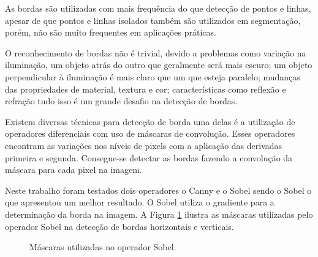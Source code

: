 As bordas são utilizadas com mais frequência do que detecção de pontos e linhas, apesar de que pontos e linhas isolados também são utilizados em segmentação, porém,  não são muito frequentes em aplicações práticas. \cite{digitalImgProcess2010}

O reconhecimento de bordas não é trivial, devido a problemas como variação na iluminação, um objeto atrás do outro que geralmente será mais escuro; um objeto perpendicular à iluminação é mais claro que um que esteja paralelo; mudanças das propriedades de material, textura e cor; características como reflexão e refração tudo isso é um grande desafio na detecção de bordas. 

Existem diversas técnicas para detecção de borda uma delas é a utilização  de operadores diferenciais com uso de máscaras de convolução. Esses operadores encontram as variações nos níveis de pixels com a aplicação das derivadas primeira e segunda. Consegue-se detectar as bordas fazendo a convolução da máscara  para cada pixel na imagem.\cite{digitalImgProcess2010}

Neste trabalho foram testados dois operadores o Canny e o Sobel sendo o Sobel o que apresentou um melhor resultado.
O Sobel utiliza o gradiente para a determinação da borda na imagem. A Figura \ref{subfig:mascara-sobel} ilustra as máscaras utilizadas pelo operador Sobel na detecção de bordas horizontais e verticais.

\begin{figure}[h]
 \centering
    \qquad
    \qquad
   \caption{ Máscaras utilizadas no operador Sobel. \cite{digitalImgProcess2010}}
  \label{subfig:mascara-sobel}
\end{figure}

